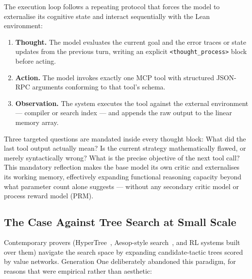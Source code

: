 \documentclass[12pt, a4paper]{article}
\begin{document}
The execution loop follows a repeating protocol that forces the model to
externalise its cognitive state and interact sequentially with the Lean
environment:

\begin{enumerate}[leftmargin=*, label=\textbf{\arabic*.}]
  \item \textbf{Thought.} The model evaluates the current goal and the error
    traces or state updates from the previous turn, writing an explicit
    \texttt{<thought\_process>} block before acting.
  \item \textbf{Action.} The model invokes exactly one MCP tool with
    structured JSON-RPC arguments conforming to that tool's schema.
  \item \textbf{Observation.} The system executes the tool against the
    external environment --- compiler or search index --- and appends the raw
    output to the linear memory array.
\end{enumerate}

Three targeted questions are mandated inside every thought block: What did
the last tool output actually mean? Is the current strategy mathematically
flawed, or merely syntactically wrong? What is the precise objective of the
next tool call? This mandatory reflection makes the base model its own
critic and externalises its working memory, effectively expanding
functional reasoning capacity beyond what parameter count alone suggests ---
without any secondary critic model or process reward model (PRM).

\subsection{The Case Against Tree Search at Small Scale}
\label{sec:no-trees}

Contemporary provers (HyperTree~\cite{lample2022hypertree}, Aesop-style
search~\cite{limperg2023aesop}, and RL systems built
over them) navigate the search space by expanding candidate-tactic trees
scored by value networks. Generation One deliberately abandoned this
paradigm, for reasons that were empirical rather than aesthetic:
\end{document}
